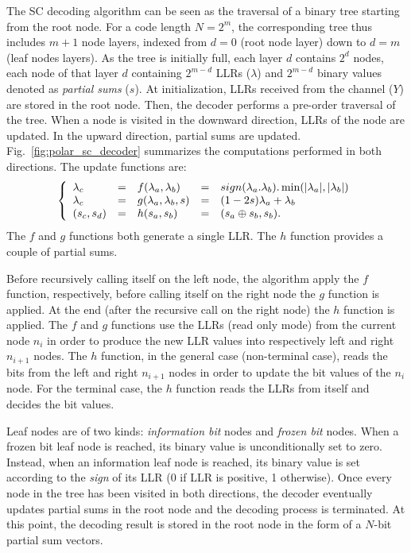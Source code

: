 The SC decoding algorithm can be seen as the traversal of a binary tree starting
from the root node. For a code length $N=2^m$, the corresponding tree thus
includes $m + 1$ node layers, indexed from $d=0$ (root node layer) down to
$d=m$ (leaf nodes layers). As the tree is initially full, each layer $d$
contains $2^d$ nodes, each node of that layer $d$  containing $2^{m-d}$ LLRs
($\lambda$) and $2^{m-d}$ binary values denoted as \textit{partial sums} ($s$).
At initialization, LLRs received  from the channel ($Y$) are stored in the root
node. Then, the decoder performs a pre-order traversal of the tree. When a node
is visited in the downward direction, LLRs of the node are updated. In the
upward direction, partial sums are updated. Fig.~\ref{fig:polar_sc_decoder}
summarizes the computations performed in both directions. The update functions
are:
\begin{eqnarray}
\left\{\begin{array}{l c l c l}
\lambda_c &=& f(\lambda_a,\lambda_b) &=& sign(\lambda_a.\lambda_b).\min(|\lambda_a|,|\lambda_b|)\\
\lambda_c &=& g(\lambda_a,\lambda_b,s)&=&(1-2s)\lambda_a+\lambda_b\\
(s_{c}, s_{d}) &=& h(s_{a}, s_{b}) &=& (s_{a} \oplus s_{b}, s_{b}).
\end{array}\right.
\label{eq:f_g}
\end{eqnarray}
The $f$ and $g$ functions both generate a single LLR. The $h$ function provides
a couple of partial sums.

Before recursively calling itself on the left node, the algorithm apply the $f$
function, respectively, before calling itself on the right node the $g$ function
is applied. At the end (after the recursive call on the right node) the $h$
function is applied. The $f$ and $g$ functions use the LLRs (read only mode)
from the current node $n_i$ in order to produce the new LLR values into
respectively left and right $n_{i+1}$ nodes. The $h$ function, in the general
case (non-terminal case), reads the bits from the left and right $n_{i+1}$ nodes
in order to update the bit values of the $n_i$ node. For the terminal case, the
$h$ function reads the LLRs from itself and decides the bit values.

Leaf nodes are of two kinds: \emph{information bit} nodes and \emph{frozen bit}
nodes. When a frozen bit leaf node is reached, its binary value is
unconditionally set to zero. Instead, when an information leaf node is reached,
its binary value is set according to the \emph{sign} of its LLR (0 if LLR is
positive, 1 otherwise). Once every node in the tree has been visited in both
directions, the decoder eventually updates partial sums in the root node and the
decoding process is terminated. At this point, the decoding result is stored in
the root node in the form of a $N$-bit partial sum vectors.

